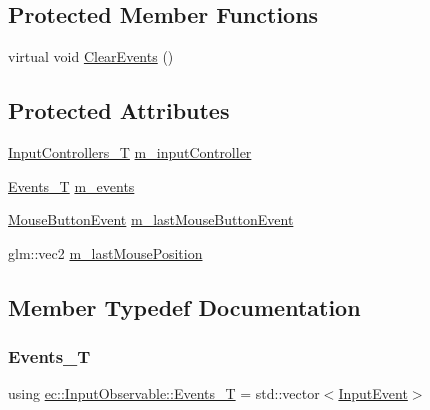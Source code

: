 \subsection*{Protected Member Functions}
\begin{DoxyCompactItemize}
\item 
virtual void \mbox{\hyperlink{classec_1_1_input_observable_a5af16f48a5bdca46229a6b5bc7769e2d}{Clear\+Events}} ()
\end{DoxyCompactItemize}
\subsection*{Protected Attributes}
\begin{DoxyCompactItemize}
\item 
\mbox{\hyperlink{classec_1_1_input_observable_afd4bca548fe9829c5fc6c0ab33254162}{Input\+Controllers\+\_\+T}} \mbox{\hyperlink{classec_1_1_input_observable_a9347ea13a20dd152cd76e0016947a802}{m\+\_\+input\+Controller}}
\item 
\mbox{\hyperlink{classec_1_1_input_observable_a9b63c8acbcbfc0f99d2964493ac52925}{Events\+\_\+T}} \mbox{\hyperlink{classec_1_1_input_observable_af83e9f99bec60cdce82b129fa457c6ab}{m\+\_\+events}}
\item 
\mbox{\hyperlink{structec_1_1_mouse_button_event}{Mouse\+Button\+Event}} \mbox{\hyperlink{classec_1_1_input_observable_adaecb6c67b919793de0a178810b54f96}{m\+\_\+last\+Mouse\+Button\+Event}}
\item 
glm\+::vec2 \mbox{\hyperlink{classec_1_1_input_observable_ae6fefe31977d17fd0ef4ab394433b08d}{m\+\_\+last\+Mouse\+Position}}
\end{DoxyCompactItemize}


\subsection{Member Typedef Documentation}
\mbox{\label{classec_1_1_input_observable_a9b63c8acbcbfc0f99d2964493ac52925}} 
\subsubsection{\texorpdfstring{Events\+\_\+T}{Events\_T}}
{\footnotesize\ttfamily using \mbox{\hyperlink{classec_1_1_input_observable_a9b63c8acbcbfc0f99d2964493ac52925}{ec\+::\+Input\+Observable\+::\+Events\+\_\+T}} =  std\+::vector$<$\mbox{\hyperlink{structec_1_1_input_event}{Input\+Event}}$>$}

